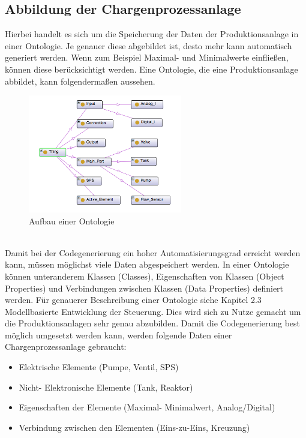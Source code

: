 \subsection{Abbildung der Chargenprozessanlage}
Hierbei handelt es sich um die Speicherung der Daten der Produktionsanlage in einer Ontologie. Je genauer diese abgebildet ist, desto mehr kann automatisch generiert werden. Wenn zum Beispiel Maximal- und Minimalwerte einfließen, können diese berücksichtigt werden.
Eine Ontologie, die eine Produktionsanlage abbildet, kann folgendermaßen aussehen. 
\begin{figure}[hbt!]
 \centering
  \includegraphics[width=0.6\textwidth]{graphics/stateoftheart/Ontology_Aufbau}
  \caption{Aufbau einer Ontologie}
\end{figure}\\
Damit bei der Codegenerierung ein hoher Automatisierungsgrad  erreicht werden kann, müssen möglichst viele Daten abgespeichert werden. In einer Ontologie können unteranderem Klassen (Classes), Eigenschaften von Klassen (Object Properties) und Verbindungen zwischen Klassen (Data Properties) definiert werden. Für genauerer Beschreibung einer Ontologie siehe Kapitel 2.3 \glqq Modellbasierte Entwicklung der Steuerung\grqq. Dies wird sich zu Nutze gemacht um die Produktionsanlagen sehr genau abzubilden. Damit die Codegenerierung best möglich umgesetzt werden kann, werden folgende Daten einer Chargenprozessanlage gebraucht:

\begin{itemize}
  \item Elektrische Elemente (Pumpe, Ventil, SPS)
  \item Nicht- Elektronische Elemente (Tank, Reaktor)
  \item Eigenschaften der Elemente (Maximal- Minimalwert, Analog/Digital)
  \item Verbindung zwischen den Elementen (Eins-zu-Eins, Kreuzung)
\end{itemize}

